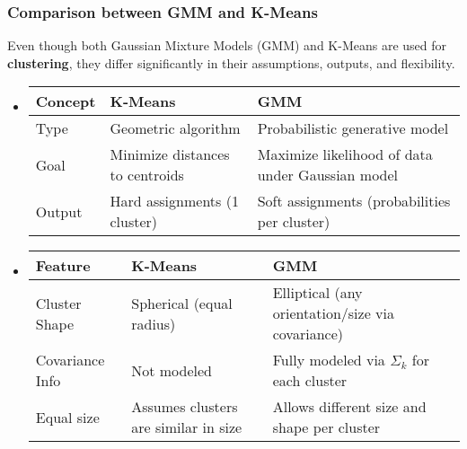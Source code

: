 \subsubsection{Comparison between GMM and K-Means}

Even though both Gaussian Mixture Models (GMM) and K-Means are used for \textbf{clustering}, they differ significantly in their assumptions, outputs, and flexibility.
\begin{itemize}
    \item {}
    \begin{table}[!htp]
        \begin{adjustbox}{width={\textwidth},totalheight={\textheight},keepaspectratio}
            \centering
            \begin{tabular}{@{} l | l | p{18em} @{}}
                \toprule
                \textbf{Concept} & \textbf{K-Means} & \textbf{GMM} \\
                \midrule
                Type    & Geometric algorithm               & Probabilistic generative model                    \\ [.3em]
                Goal    & Minimize distances to centroids   & Maximize likelihood of data under Gaussian model  \\ [.3em]
                Output  & Hard assignments (1 cluster)      & Soft assignments (probabilities per cluster)      \\
                \bottomrule
            \end{tabular}
        \end{adjustbox}
    \end{table}

    \item {}
    \begin{table}[!htp]
        \begin{adjustbox}{width={\textwidth},totalheight={\textheight},keepaspectratio}
            \centering
            \begin{tabular}{@{} l | p{11em} | p{20em} @{}}
                \toprule
                \textbf{Feature} & \textbf{K-Means} & \textbf{GMM} \\
                \midrule
                Cluster Shape   & Spherical (equal radius)             & Elliptical (any orientation/size via covariance) \\ [.3em]
                Covariance Info & Not modeled                          & Fully modeled via $\Sigma_k$ for each cluster    \\ [.3em]
                Equal size      & Assumes clusters are similar in size & Allows different size and shape per cluster      \\
                \bottomrule
            \end{tabular}
        \end{adjustbox}
    \end{table}
    


\end{itemize}
